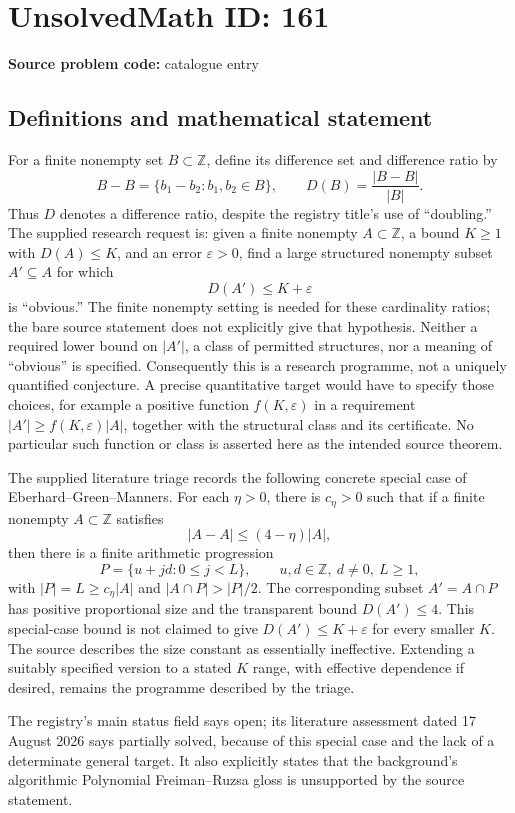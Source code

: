 \documentclass[11pt]{article}
\newcommand{\Z}{\mathbb{Z}}
\begin{document}
\section*{UnsolvedMath ID: 161}
\textbf{Source problem code:} catalogue entry
\subsection{Definitions and mathematical statement}
For a finite nonempty set $B\subset\Z$, define its difference set and difference ratio by
\[
 B-B=\{b_1-b_2:b_1,b_2\in B\},\qquad D(B)=\frac{|B-B|}{|B|}.
\]
Thus $D$ denotes a difference ratio, despite the registry title's use of ``doubling.'' The supplied research request is: given a finite nonempty $A\subset\Z$, a bound $K\ge1$ with $D(A)\le K$, and an error $\varepsilon>0$, find a large structured nonempty subset $A'\subseteq A$ for which
\[
 D(A')\le K+\varepsilon
\]
is ``obvious.'' The finite nonempty setting is needed for these cardinality ratios; the bare source statement does not explicitly give that hypothesis. Neither a required lower bound on $|A'|$, a class of permitted structures, nor a meaning of ``obvious'' is specified. Consequently this is a research programme, not a uniquely quantified conjecture. A precise quantitative target would have to specify those choices, for example a positive function $f(K,\varepsilon)$ in a requirement $|A'|\ge f(K,\varepsilon)|A|$, together with the structural class and its certificate. No particular such function or class is asserted here as the intended source theorem.

The supplied literature triage records the following concrete special case of Eberhard--Green--Manners. For each $\eta>0$, there is $c_\eta>0$ such that if a finite nonempty $A\subset\Z$ satisfies
\[
 |A-A|\le(4-\eta)|A|,
\]
then there is a finite arithmetic progression
\[
 P=\{u+jd:0\le j<L\},\qquad u,d\in\Z,\ d\ne0,\ L\ge1,
\]
with $|P|=L\ge c_\eta|A|$ and $|A\cap P|>|P|/2$. The corresponding subset $A'=A\cap P$ has positive proportional size and the transparent bound $D(A')\le4$. This special-case bound is not claimed to give $D(A')\le K+\varepsilon$ for every smaller $K$. The source describes the size constant as essentially ineffective. Extending a suitably specified version to a stated $K$ range, with effective dependence if desired, remains the programme described by the triage.

The registry's main status field says open; its literature assessment dated 17 August 2026 says partially solved, because of this special case and the lack of a determinate general target. It also explicitly states that the background's algorithmic Polynomial Freiman--Ruzsa gloss is unsupported by the source statement.
\end{document}
